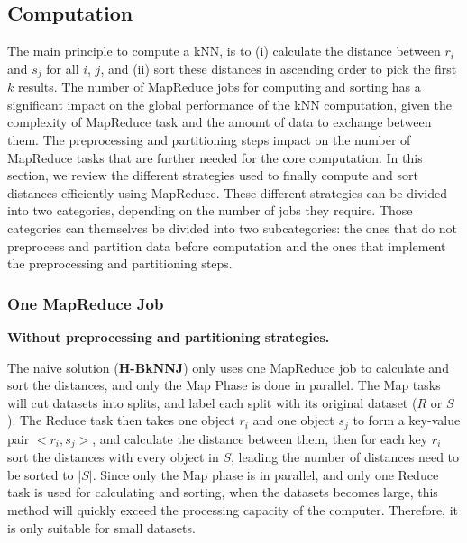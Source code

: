 \documentclass[10pt,journal,compsoc]{IEEEtran}
\newcommand{\HBK}{{\bf H-BkNNJ}}
\begin{document}
%
\subsection{Computation} 
The main principle to compute a kNN, is to (i) calculate the distance between $r_i$ and $s_j$ for all $i$, 
$j$, and (ii) sort these distances in ascending order to 
pick the first $k$ results. The number of MapReduce jobs for computing and sorting has
a significant impact on the global performance of the kNN computation, given the complexity of MapReduce task and the amount of data to exchange between them. 
The preprocessing and partitioning steps impact on the number of MapReduce tasks that are further needed for the core computation. 
In this section, we review the 
different strategies used to finally compute and sort distances efficiently using MapReduce. These different strategies can be divided into two categories, depending on the number of jobs they require. Those categories can themselves be divided into two subcategories: the ones that do 
not preprocess and partition data before computation and the ones that implement the preprocessing and partitioning steps. 

\subsubsection{One MapReduce Job}

\noindent \textbf{Without preprocessing and partitioning strategies.} 

\noindent The naive solution (\HBK) only uses one MapReduce job to calculate and sort the distances, and only the Map Phase is done in parallel. The Map tasks will cut datasets into splits, and label each split with its original dataset ($R$ or $S$). The Reduce task then takes one object $r_i$ and one object $s_j$ to form a key-value pair $<r_i, s_j>$, and calculate the distance between them, then for each key $r_i$ sort the distances with every object in $S$, leading the number of distances need to be sorted to $|S|$. Since only the Map phase is in parallel, and only one Reduce task is used for calculating and sorting, when the datasets becomes large, this method will quickly exceed the processing capacity of the computer. Therefore, it is only suitable for small datasets.
\end{document}

